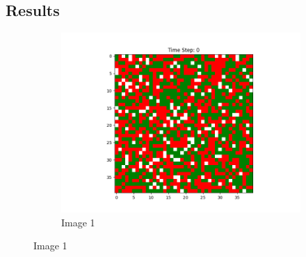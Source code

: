 \documentclass[12pt]{article}
\begin{document}
\subsection{Results}
	\begin{figure}[h]
		\centering
		\begin{subfigure}{0.2\textwidth}
			\includegraphics[width=\linewidth]{initial_random.png}
			\caption{Image 1}
		\end{subfigure}\hspace{0.02\textwidth}
		

\end{figure}
\end{document}
